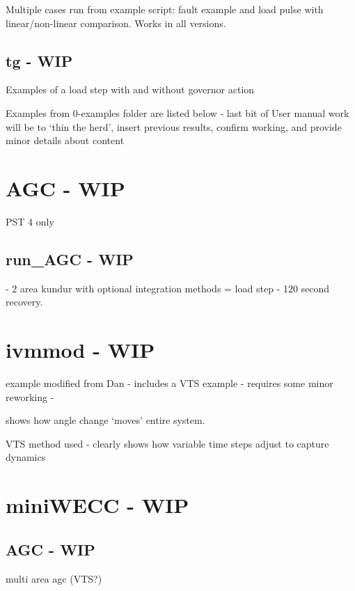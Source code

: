 Multiple cases run from example script: fault example and load pulse with linear/non-linear comparison.
Works in all versions.

\subsection{tg - WIP}
Examples of a load step with and without governor action

\pagebreak
Examples from 0-examples folder are listed below - last bit of User manual work will be to `thin the herd', insert previous results, confirm working, and provide minor details about content


\section{AGC - WIP}
PST 4 only

\subsection{run\_AGC - WIP}
- 2 area kundur with optional integration methods = load step - 120 second recovery.






\pagebreak



\pagebreak
\section{ivmmod - WIP}
example modified from Dan - includes a VTS example  -
requires some minor reworking - 

shows how angle change `moves' entire system.

VTS method used - clearly shows how variable time steps adjust to capture dynamics


\pagebreak
\section{miniWECC - WIP}

	\subsection{AGC - WIP} 
multi area agc (VTS?)

